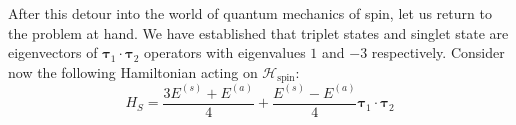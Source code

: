 After this detour into the world of quantum mechanics of spin, let us return to the problem
at hand. We have established that triplet states and singlet state are eigenvectors of 
\(\bm{\tau}_1 \cdot \bm{\tau}_2\) operators with eigenvalues \(1\) and \(-3\) respectively.
Consider now the following Hamiltonian acting on \(\mathcal{H}_{\textrm{spin}}\):
\begin{equation}
    H_S = \frac{3 E^{(s)} + E^{(a)}}{4} + \frac{E^{(s)} - E^{(a)}}{4} \bm{\tau}_1 \cdot \bm{\tau}_2
    \label{eq:Coulomb recasted}
\end{equation}
